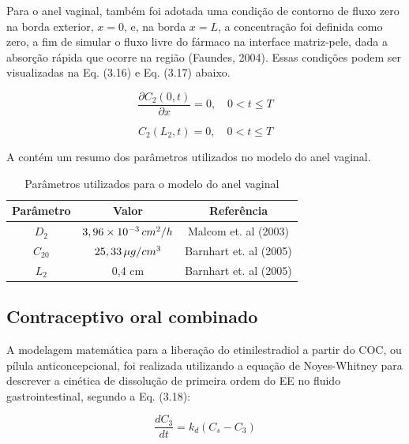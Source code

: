 Para o anel vaginal, também foi adotada uma condição de contorno de fluxo zero na borda exterior, $x = 0$, e, na borda $x = L$, a concentração foi definida como zero, a fim de simular o fluxo livre do fármaco na interface matriz-pele, dada a absorção rápida que ocorre na região (Faundes, 2004). Essas condições podem ser visualizadas na Eq. (3.16) e Eq. (3.17) abaixo.

\begin{equation}
\frac{\partial C_2(0,t)}{\partial x} = 0, \quad 0 < t \leq T
\end{equation}

\begin{equation}
C_2(L_2,t) = 0, \quad 0 < t \leq T
\end{equation}

A  contém um resumo dos parâmetros utilizados no modelo do anel vaginal.

\begin{table}[!htp]
\caption[Parâmetros para o anel vaginal]{Parâmetros utilizados para o modelo do anel vaginal}
\label{tab:tabela_2}
\begin{center}
\begin{tabular}{ccc}
\toprule %
Parâmetro & Valor & Referência \\ \midrule %
\textbf{$D_2$}  & $3,96 \times 10^{-3} \, cm\textsuperscript{2}/h$ & Malcom et. al (2003) \\
\textbf{$C_{20}$} & $25,33 \, \mu g/cm\textsuperscript{3}$ & Barnhart et. al (2005) \\
\textbf{$L_2$}  & 0,4 cm & Barnhart et. al (2005) \\\bottomrule %
\end{tabular}
\end{center}
\end{table}

\subsection{Contraceptivo oral combinado}

A modelagem matemática para a liberação do etinilestradiol a partir do COC, ou pílula anticoncepcional, foi realizada utilizando a equação de Noyes-Whitney para descrever a cinética de dissolução de primeira ordem do EE no fluido gastrointestinal, segundo a Eq. (3.18):

\begin{equation}
    \frac{dC_3}{dt} = k_d (C_s - C_3)
\end{equation}

